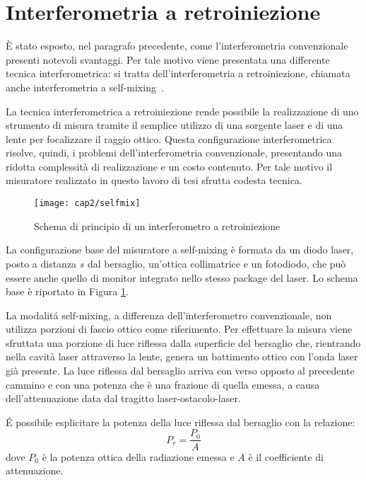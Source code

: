\section{Interferometria a retroiniezione}
È stato esposto, nel paragrafo precedente, come l'interferometria convenzionale presenti notevoli svantaggi. Per tale motivo viene presentata una differente tecnica interferometrica: si tratta dell'interferometria a retroiniezione, chiamata anche interferometria a self-mixing~\cite{1464-4258-4-6-371}.

La tecnica interferometrica a retroiniezione rende possibile la realizzazione di uno strumento di misura tramite il semplice utilizzo di una sorgente laser e di una lente per focalizzare il raggio ottico. Questa configurazione interferometrica risolve, quindi, i problemi dell'interferometria convenzionale, presentando una ridotta complessità di realizzazione e un costo contenuto. Per tale motivo il misuratore realizzato in questo lavoro di tesi sfrutta codesta tecnica.

\begin{figure}  
  \begin{center}
    \texttt{[image: cap2/selfmix]}
    \caption{Schema di principio di un interferometro a retroiniezione}
    \label{selfmix}
  \end{center}
\end{figure}

La configurazione base del misuratore a self-mixing è formata da un diodo laser, posto a distanza $s$ dal bersaglio, un'ottica collimatrice e un fotodiodo, che può essere anche quello di monitor integrato nello stesso package del laser. Lo schema base è riportato in Figura \ref{selfmix}.

La modalitá self-mixing, a differenza dell'interferometro convenzionale, non utilizza porzioni di fascio ottico come riferimento. Per effettuare la misura viene sfruttata una porzione di luce riflessa dalla superficie del bersaglio che, rientrando nella cavità laser attraverso la lente, genera un battimento ottico con l'onda laser già presente. La luce riflessa dal bersaglio arriva con verso opposto al precedente cammino e con una potenza che è una frazione di quella emessa, a causa dell'attenuazione data dal tragitto laser-ostacolo-laser.

\'E possibile esplicitare la potenza della luce riflessa dal bersaglio con la relazione:
\begin{equation}
	P_r=\frac{P_0}{A}
\end{equation}
dove $P_0$ è la potenza ottica della radiazione emessa e $A$ è il coefficiente di attenuazione.

